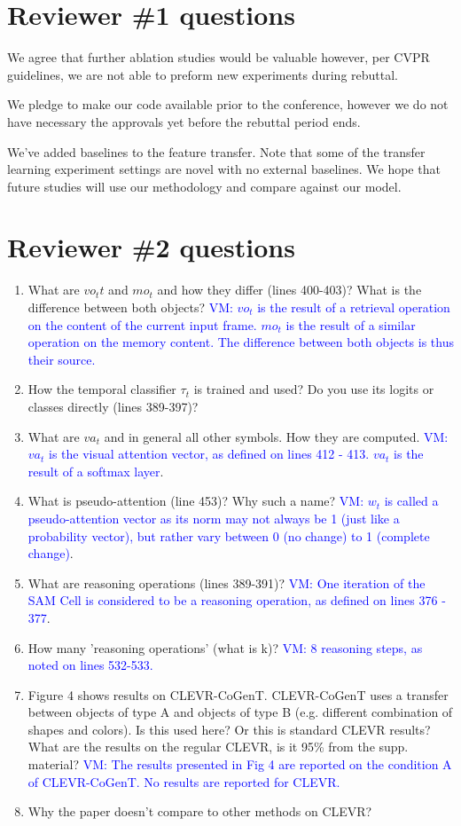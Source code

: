 \documentclass[10pt,twocolumn,letterpaper]{article}
\newcommand{\vm}[1]{\textcolor{blue}{VM: #1}}
\begin{document}
\section{Reviewer \#1 questions}

We agree that further ablation studies would be valuable however, per CVPR guidelines, we are not able to preform new experiments during rebuttal.

We pledge to make our code available prior to the conference, however we do not have necessary the approvals yet before the rebuttal period ends.

We've added baselines to the feature transfer. Note that some of the transfer learning experiment settings are novel with no external baselines. We hope that future studies will use our methodology and compare against our model.

\section{Reviewer \#2 questions}

\begin{enumerate}
  \item What are $vo_tt$ and $mo_t$ and how they differ (lines 400-403)? What is the difference between both objects? \vm{$vo_t$ is the result of a retrieval operation on the content of the current input frame. $mo_t$ is the result of a similar operation on the memory content. The difference between both objects is thus their source.}

  \item How the temporal classifier $\tau_t$ is trained and used? Do you use its logits or classes directly (lines 389-397)?
  \item What are $va_t$ and in general all other symbols. How they are computed. \vm{$va_t$ is the visual attention vector, as defined on lines 412 - 413. $va_t$ is the result of a softmax layer}.
  \item What is pseudo-attention (line 453)? Why such a name? \vm{$w_t$ is called a pseudo-attention vector as its norm may not always be 1 (just like a probability vector), but rather vary between 0 (no change) to 1 (complete change)}.
  \item What are reasoning operations (lines 389-391)? \vm{One iteration of the SAM Cell is considered to be a reasoning operation, as defined on lines 376 - 377}.
  \item How many 'reasoning operations' (what is k)? \vm{8 reasoning steps, as noted on lines 532-533.}
  \item Figure 4 shows results on CLEVR-CoGenT. CLEVR-CoGenT uses a transfer between objects of type A and objects of type B (e.g. different combination of shapes and colors). Is this used here? Or this is standard CLEVR results? What are the results on the regular CLEVR, is it 95\% from the supp. material? \vm{The results presented in Fig 4 are reported on the condition A of CLEVR-CoGenT. No results are reported for CLEVR.}
  \item Why the paper doesn't compare to other methods on CLEVR?
\end{enumerate}



% 
% 
\end{document}

